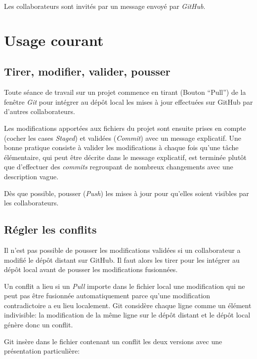 \documentclass[
  12pt,
  french,
  a4paper,
  extrafontsizes,onecolumn,openright
  ]{memoir}
\begin{document}
\normalsize

Les collaborateurs sont invités par un message envoyé par \emph{GitHub}.

\section{Usage courant}\label{usage-courant}

\subsection{Tirer, modifier, valider, pousser}\label{tirer-modifier-valider-pousser}

Toute séance de travail sur un projet commence en tirant (Bouton \enquote{Pull}) de la fenêtre \emph{Git} pour intégrer au dépôt local les mises à jour effectuées sur GitHub par d'autres collaborateurs.

Les modifications apportées aux fichiers du projet sont ensuite prises en compte (cocher les cases \emph{Staged}) et validées (\emph{Commit}) avec un message explicatif.
Une bonne pratique consiste à valider les modifications à chaque fois qu'une tâche élémentaire, qui peut être décrite dans le message explicatif, est terminée plutôt que d'effectuer des \emph{commits} regroupant de nombreux changements avec une description vague.

Dès que possible, pousser (\emph{Push}) les mises à jour pour qu'elles soient visibles par les collaborateurs.

\subsection{Régler les conflits}\label{ruxe9gler-les-conflits}

Il n'est pas possible de pousser les modifications validées si un collaborateur a modifié le dépôt distant sur GitHub.
Il faut alors les tirer pour les intégrer au dépôt local avant de pousser les modifications fusionnées.

Un conflit a lieu si un \emph{Pull} importe dans le fichier local une modification qui ne peut pas être fusionnée automatiquement parce qu'une modification contradictoire a eu lieu localement.
Git considère chaque ligne comme un élément indivisible: la modification de la même ligne sur le dépôt distant et le dépôt local génère donc un conflit.

Git insère dans le fichier contenant un conflit les deux versions avec une présentation particulière:
\end{document}
